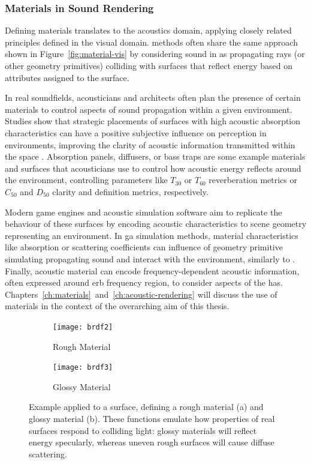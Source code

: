 \subsubsection{Materials in Sound Rendering}
Defining materials translates to the acoustics domain, applying closely related principles defined in the visual domain.  methods often share the same approach shown in Figure~\ref{fig:material-vis} by considering sound in  as propagating rays (or other geometry primitives) colliding with surfaces that reflect energy based on attributes assigned to the surface.\par
In real soundfields, acousticians and architects often plan the presence of certain materials to control aspects of sound propagation within a given environment. Studies show that strategic placements of surfaces with high acoustic absorption characteristics can have a positive subjective influence on perception in environments, improving the clarity of acoustic information transmitted within the space \citep{arvidsson2021subjective}. Absorption panels, diffusers, or bass traps are some example materials and surfaces that acousticians use to control how acoustic energy reflects around the environment, controlling parameters like $T_{30}$ or $T_{60}$ reverberation metrics or $C_{50}$ and $D_{50}$ clarity and definition metrics, respectively.\par
Modern game engines and acoustic simulation software aim to replicate the behaviour of these surfaces by encoding acoustic characteristics to scene geometry representing an environment. In \acrshort{ga} simulation methods, material characteristics like absorption or scattering coefficients can influence of geometry primitive simulating propagating sound and interact with the environment, similarly to  \citep{rindel2000use}. Finally, acoustic material can encode frequency-dependent acoustic information, often expressed around \acrfull{erb} frequency region, to consider aspects of the \acrshort{has}. Chapters~\ref{ch:materials}~and~\ref{ch:acoustic-rendering} will discuss the use of materials in the context of the overarching aim of this thesis.

\begin{figure}
  \centering
    \begin{subfigure}[t]{0.49\textwidth}
       \centering
       \texttt{[image: brdf2]}
       \caption{Rough Material}\label{fig:brdf1}
    \end{subfigure}
  \hfill
    \begin{subfigure}[t]{0.49\textwidth}
       \centering
       \texttt{[image: brdf3]}
       \caption{Glossy Material}\label{fig:brdf2}
    \end{subfigure}
  \caption[Visualisation of example BRDFs]{Example  applied to a surface, defining a rough material (a) and glossy material (b). These functions emulate how properties of real surfaces respond to colliding light: glossy materials will reflect energy specularly, whereas uneven rough surfaces will cause diffuse scattering.}\label{fig:brdf-vis}
\end{figure}

